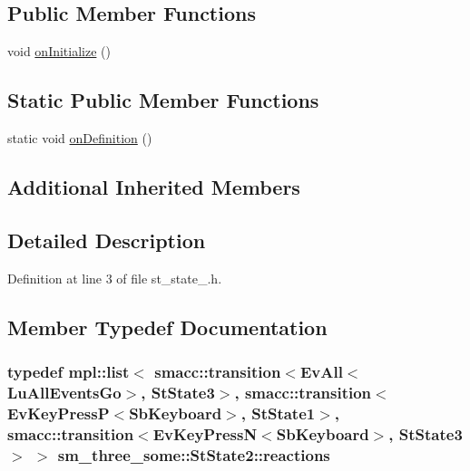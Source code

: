\subsection*{Public Member Functions}
\begin{DoxyCompactItemize}
\item 
void \hyperlink{structsm__three__some_1_1StState2_a31e1bc14ec72b4fa9dcc6a11d8e77762}{on\+Initialize} ()
\end{DoxyCompactItemize}
\subsection*{Static Public Member Functions}
\begin{DoxyCompactItemize}
\item 
static void \hyperlink{structsm__three__some_1_1StState2_a6fbadc32e16e7c1defafe35a6e1b08da}{on\+Definition} ()
\end{DoxyCompactItemize}
\subsection*{Additional Inherited Members}


\subsection{Detailed Description}


Definition at line 3 of file st\+\_\+state\+\_.\+h.



\subsection{Member Typedef Documentation}
\subsubsection[{\texorpdfstring{reactions}{reactions}}]{\setlength{\rightskip}{0pt plus 5cm}typedef mpl\+::list$<$ {\bf smacc\+::transition}$<$Ev\+All$<$Lu\+All\+Events\+Go$>$, {\bf St\+State3}$>$, {\bf smacc\+::transition}$<${\bf Ev\+Key\+PressP}$<${\bf Sb\+Keyboard}$>$, {\bf St\+State1}$>$, {\bf smacc\+::transition}$<${\bf Ev\+Key\+PressN}$<${\bf Sb\+Keyboard}$>$, {\bf St\+State3}$>$ $>$ {\bf sm\+\_\+three\+\_\+some\+::\+St\+State2\+::reactions}}\hypertarget{structsm__three__some_1_1StState2_a9627f8a90cbf6f192b892e29a1280dd2}{}\label{structsm__three__some_1_1StState2_a9627f8a90cbf6f192b892e29a1280dd2}


